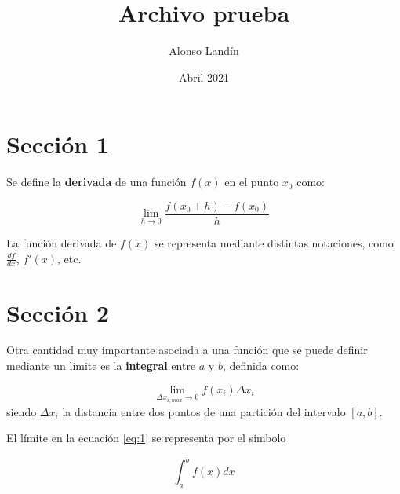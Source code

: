 \documentclass{article}
\title{Archivo prueba}
\author{Alonso Landín}
\date{Abril 2021}
\begin{document}
\maketitle

\section*{Sección 1}


Se define la \textbf{derivada} de una función $f(x)$ en el punto $x_0$ como:

$$ \lim_{h \to 0}\frac{f(x_0+h)-f(x_0)}{h} $$

La función derivada de $f(x)$ se representa mediante distintas notaciones, como $\frac{df}{dx}$, $f'(x)$, etc.

\section*{Sección 2}


Otra cantidad muy importante asociada a una función que se puede definir mediante un límite es la \textbf{integral} entre $a$ y $b$, definida como:

\begin{equation} \label{eq:1}
\lim_{\Delta x_{i,max} \to 0}f(x_i)\Delta x_i
\end{equation}
siendo $\Delta x_i$ la distancia entre dos puntos de una partición del intervalo $[a,b]$.


El límite en la ecuación \ref{eq:1} se representa por el símbolo

$$ \int_a^b f(x)dx $$
\end{document}
